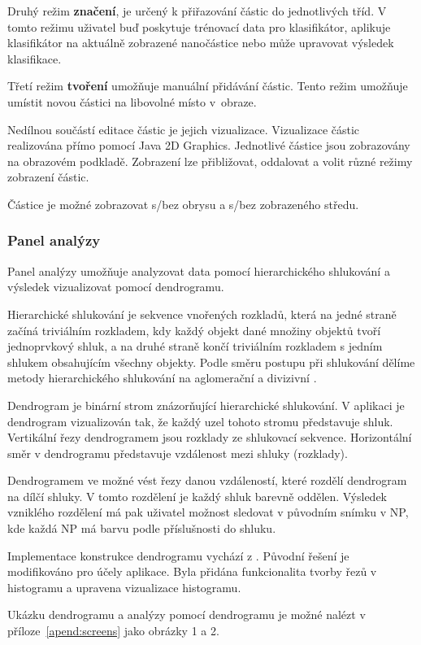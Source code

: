 \documentclass[11pt,twoside,a4paper,table]{book}
\begin{document}
Druhý režim \textbf{značení}, je určený k přiřazování částic do jednotlivých tříd. V tomto režimu uživatel buď poskytuje trénovací data pro klasifikátor, aplikuje klasifikátor na aktuálně zobrazené nanočástice nebo může upravovat výsledek klasifikace.

Třetí režim \textbf{tvoření} umožňuje manuální přidávání částic. Tento režim umožňuje umístit novou částici na libovolné místo v~obraze.

Nedílnou součástí editace částic je jejich vizualizace. Vizualizace částic realizována přímo pomocí Java 2D Graphics. Jednotlivé částice jsou zobrazovány na obrazovém podkladě. Zobrazení lze přibližovat, oddalovat a volit různé režimy zobrazení částic.

Částice je možné zobrazovat s/bez obrysu a s/bez zobrazeného středu.

\subsubsection{Panel analýzy}
Panel analýzy umožňuje analyzovat data pomocí hierarchického shlukování a výsledek vizualizovat pomocí dendrogramu.

Hierarchické shlukování je sekvence vnořených rozkladů, která na jedné straně začíná triviálním rozkladem, kdy každý objekt dané množiny objektů tvoří jednoprvkový shluk, a na
druhé straně končí triviálním rozkladem s jedním shlukem obsahujícím všechny objekty.
Podle směru postupu při shlukování dělíme metody hierarchického shlukování na aglomerační
a divizivní \cite{on:shlukovani}.

Dendrogram je binární strom znázorňující hierarchické shlukování. V aplikaci je dendrogram vizualizován tak, že každý uzel tohoto stromu představuje shluk. Vertikální řezy dendrogramem jsou rozklady ze shlukovací sekvence. Horizontální směr v dendrogramu představuje vzdálenost mezi shluky (rozklady).

Dendrogramem ve možné vést řezy danou vzdáleností, které rozdělí dendrogram na dílčí shluky. V tomto rozdělení je každý shluk barevně oddělen. Výsledek vzniklého rozdělení má pak uživatel možnost sledovat v původním snímku v NP, kde každá NP má barvu podle příslušnosti do shluku.  

Implementace konstrukce dendrogramu vychází z \cite{on:shlukovani_java}. Původní řešení je modifikováno pro účely aplikace. Byla přidána funkcionalita tvorby řezů v histogramu a upravena vizualizace histogramu.

Ukázku dendrogramu a analýzy pomocí dendrogramu je možné nalézt v příloze~\ref{apend:screens} jako obrázky 1 a 2.
\end{document}
